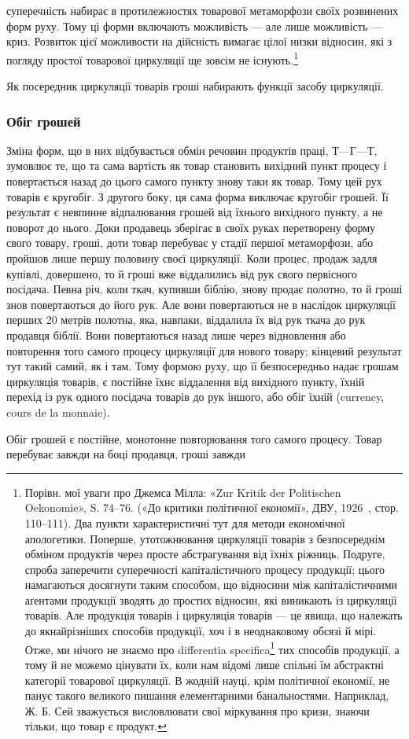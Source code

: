 \parcont{}  %
суперечність набирає в протилежностях товарової метаморфози
своїх розвинених форм руху. Тому ці форми включають можливість
— але лише можливість — криз. Розвиток цієї можливости
на дійсність вимагає цілої низки відносин, які з погляду простої
товарової циркуляції ще зовсім не існують.\footnote{
Порівн. мої уваги про Джемса Мілла: «Zur Kritik der Politischen
Oekonomie», S. 74--76. («До критики політичної економії», ДВУ, 1926~,
стор. 110--111). Два пункти характеристичні тут для методи економічної
апологетики. Поперше, утотожнювання циркуляції товарів з безпосереднім
обміном продуктів через просте абстрагування від їхніх ріжниць.
Подруге, спроба заперечити суперечності капіталістичного процесу продукції;
цього намагаються досягнути таким способом, що відносини між
капіталістичними аґентами продукції зводять до простих відносин, які
виникають із циркуляції товарів. Але продукція товарів і циркуляція
товарів — це явища, що належать до якнайрізніших способів продукції,
хоч і в неоднаковому обсязі й мірі. Отже, ми нічого не знаємо про differentia
specifica\footnote*{
— характеристичні особливості. \emph{Ред.}
} тих способів продукції, а тому й не можемо цінувати їх,
коли нам відомі лише спільні їм абстрактні категорії товарової циркуляції.
В жодній науці, крім політичної економії, не панує такого великого
пишання елементарними банальностями. Наприклад, Ж. Б. Сей зважується
висловлювати свої міркування про кризи, знаючи тільки, що товар
є продукт.
}

Як посередник циркуляції товарів гроші набирають функції
засобу циркуляції.

\subsubsection{Обіг грошей}

Зміна форм, що в них відбувається обмін речовин продуктів
праці, $Т — Г — Т$, зумовлює те, що та сама вартість як товар
становить вихідний пункт процесу і повертається назад до цього
самого пункту знову таки як товар. Тому цей рух товарів є кругобіг.
З другого боку, ця сама форма виключає кругобіг грошей.
Її результат є невпинне відпалювання грошей від їхнього вихідного
пункту, а не поворот до нього. Доки продавець зберігає
в своїх руках перетворену форму свого товару, гроші, доти
товар перебуває у стадії першої метаморфози, або пройшов лише
першу половину своєї циркуляції. Коли процес, продаж задля
купівлі, довершено, то й гроші вже віддалились від рук свого
первісного посідача. Певна річ, коли ткач, купивши біблію,
знову продає полотно, то й гроші знов повертаються до його рук.
Але вони повертаються не в наслідок циркуляції перших
20 метрів полотна, яка, навпаки, віддалила їх від рук ткача
до рук продавця біблії. Вони повертаються назад лише через
відновлення або повторення того самого процесу циркуляції
для нового товару; кінцевий результат тут такий самий, як
і там. Тому формою руху, що її безпосередньо надає грошам
циркуляція товарів, є постійне їхнє віддалення від вихідного
пункту, їхній перехід із рук одного посідача товарів до рук
іншого, або обіг їхній (currency, cours de la monnaie).

Обіг грошей є постійне, монотонне повторювання того самого
процесу. Товар перебуває завжди на боці продавця, гроші завжди
\parbreak{}  %
